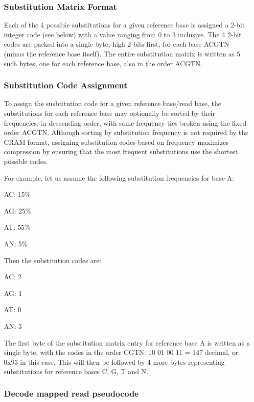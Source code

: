 \documentclass[a4paper]{article}
\begin{document}
\subsubsection*{Substitution Matrix Format}

Each of the 4 possible substitutions for a given reference base is assigned a 2-bit integer
code (see below) with a value ranging from 0 to 3 inclusive. The 4 2-bit codes are packed
into a single byte, high 2-bits first, for each base ACGTN (minus the reference base itself).
The entire substitution matrix is written as 5 such bytes, one for each reference base, also
in the order ACGTN.

\subsubsection*{Substitution Code Assignment}

To assign the susbtitution code for a given reference base/read base, the substitutions for
each reference base may optionally be sorted by their frequencies, in descending order, with
same-frequency ties broken using the fixed order ACGTN. Although sorting by substitution
frequency is not required by the CRAM format, assigning substitution codes based on frequency
maximizes compression by ensuring that the most frequent substitutions use the shortest possible
codes.

For example, let us assume the following substitution frequencies for base A: 

AC: 15\%

AG: 25\%

AT: 55\%

AN: 5\%

Then the substitution codes are: 

AC: 2

AG: 1

AT: 0

AN: 3

The first byte of the substitution matrix entry for reference base A is written as a single byte,
with the codes in the order CGTN: 10 01 00 11 = 147 decimal, or 0x93 in this case. This will then
be followed by 4 more bytes representing substitutions for reference bases C, G, T and N.

\subsubsection*{Decode mapped read pseudocode}
\end{document}
